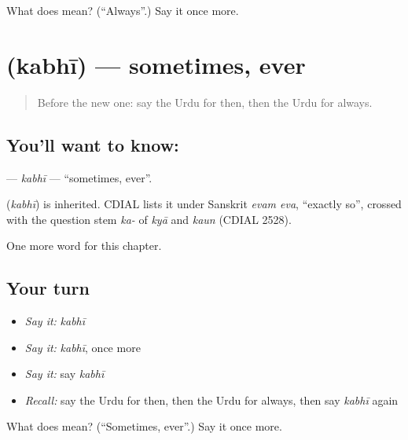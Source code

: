 \begin{tcolorbox}[breakable,colback=teal!4,colframe=teal!35!black,title={Before you move on}]
What does  mean? (\textquotedblleft{}Always\textquotedblright{}.) Say it once more.
\end{tcolorbox}
\section[\texorpdfstring{\ur{کبھی} (kabhī)}{کبھی (kabhī)}]{ (kabhī) — sometimes, ever}

\label{lesson:UR-C77-kabhi}



\begin{quote}
Before the new one: say the Urdu for then, then the Urdu for always.
\end{quote}

\subsection*{You'll want to know: }
\textbf{} — \emph{kabhī} — \textquotedblleft{}sometimes, ever\textquotedblright{}.

\begin{cousinweb}
\textbf{} (\emph{kabhī}) is inherited. CDIAL lists it under Sanskrit \emph{evam eva}, \textquotedblleft{}exactly so\textquotedblright{}, crossed with the question stem \emph{ka-} of \emph{kyā} and \emph{kaun} (CDIAL 2528).
\end{cousinweb}

\begin{grammarlens}[title={What you've built}]
One more word for this chapter.
\end{grammarlens}

\subsection*{Your turn}
\begin{itemize}
\raggedright
  \item \emph{Say it:} \emph{kabhī}
  \item \emph{Say it:} \emph{kabhī}, once more
  \item \emph{Say it:} say \emph{kabhī}
  \item \emph{Recall:} say the Urdu for then, then the Urdu for always, then say \emph{kabhī} again
\end{itemize}

\begin{tcolorbox}[breakable,colback=teal!4,colframe=teal!35!black,title={Before you move on}]
What does  mean? (\textquotedblleft{}Sometimes, ever\textquotedblright{}.) Say it once more.
\end{tcolorbox}
